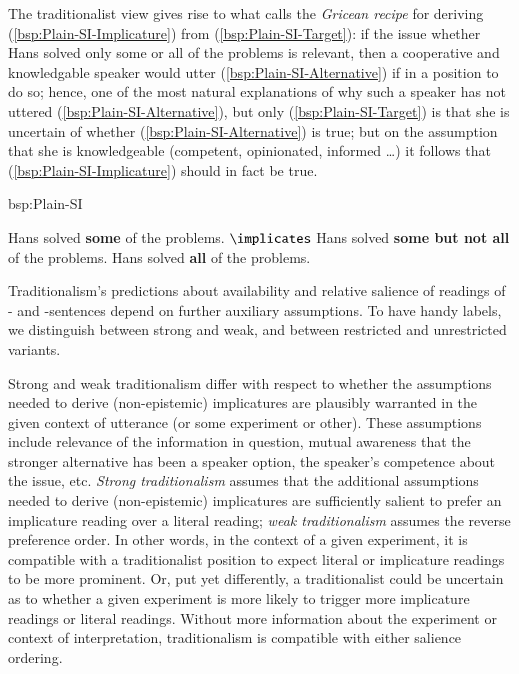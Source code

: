 \documentclass[fleqn,reqno,10pt]{article}
\newcommand{\as}{\acro{as}}
\renewcommand{\es}{\acro{es}}
\renewcommand{\mymark}[1]{\textbf{#1}}
\begin{document}
The traditionalist view gives rise to what
\citet{Geurts2010:Quantity-Implic} calls the \emph{Gricean recipe} for
deriving (\ref{bsp:Plain-SI-Implicature}) from
(\ref{bsp:Plain-SI-Target}): if the issue whether Hans solved only
some or all of the problems is relevant, then a cooperative and
knowledgable speaker would utter (\ref{bsp:Plain-SI-Alternative}) if
in a position to do so; hence, one of the most natural explanations of
why such a speaker has not uttered (\ref{bsp:Plain-SI-Alternative}),
but only (\ref{bsp:Plain-SI-Target}) is that she is uncertain of
whether (\ref{bsp:Plain-SI-Alternative}) is true; but on the
assumption that she is knowledgeable (competent, opinionated, informed
\dots) it follows that (\ref{bsp:Plain-SI-Implicature}) should in fact
be true.

\begin{exer}{bsp:Plain-SI}
  \ex 
    \begin{xlist}
      \ex \label{bsp:Plain-SI-Target} Hans solved \mymark{some} of the problems.
      \ex \label{bsp:Plain-SI-Implicature} $\implicates$ Hans solved
        \mymark{some but not all} of the problems.
      \ex  \label{bsp:Plain-SI-Alternative}  Hans solved \mymark{all} of the problems.
    \end{xlist}
\end{exer}

Traditionalism's predictions about availability and relative salience
of readings of \as- and \es-sentences depend on further auxiliary
assumptions. To have handy labels, we distinguish between strong and
weak, and between restricted and unrestricted variants.

Strong and weak traditionalism differ with respect to whether the
assumptions needed to derive (non-epistemic) implicatures are
plausibly warranted in the given context of utterance (or some
experiment or other). These assumptions include relevance of the
information in question, mutual awareness that the stronger
alternative has been a speaker option, the speaker's competence about
the issue, etc. \emph{Strong traditionalism} assumes that the
additional assumptions needed to derive (non-epistemic) implicatures
are sufficiently salient to prefer an implicature reading over a
literal reading; \emph{weak traditionalism} assumes the reverse
preference order. In other words, in the context of a given
experiment, it is compatible with a traditionalist position to expect
literal or implicature readings to be more prominent. Or, put yet
differently, a traditionalist could be uncertain as to whether a given
experiment is more likely to trigger more implicature readings or
literal readings. Without more information about the experiment or
context of interpretation, traditionalism is compatible with either
salience ordering.
\end{document}
